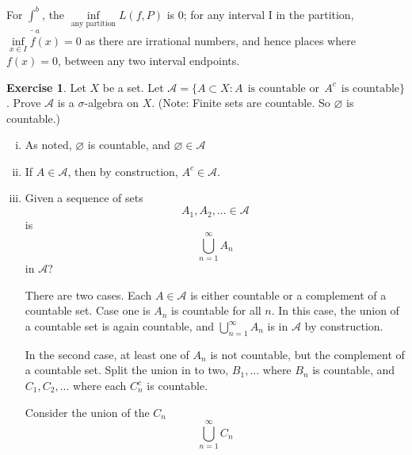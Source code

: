 \documentclass[11pt,oneside]{article}
\numberwithin{equation}{section}
\theoremstyle{definition}
\newtheorem{exercise}{Exercise}
\def\calA{\mathcal{A}}
\begin{document}
\begin{solution}
  For $\underline \int _a ^b$,
  the $\inf \limits_{\text{any partition}} L(f, P)$ is $0$;
  for any interval I in the
  partition, $\inf \limits _ {x \in I} f(x) = 0$ as there are
  irrational numbers, and hence places where $f(x) = 0$, between any
  two interval endpoints.
\end{solution}

\begin{exercise}
  Let $X$ be a set. Let $ \calA = \{A \subset X : A \ \ \text{is 
    countable or} \ \ A^c \ \ \text{is countable} \}$.  Prove $\calA$ is a
    $\sigma$-algebra on $X$. (Note: Finite sets are countable. So
    $\varnothing$ is countable.)
\end{exercise}
\begin{solution}
  \begin{enumerate}[(i)]
    \item
      As noted, $\varnothing $ is countable, and $\varnothing \in \calA$
    \item
      If $A \in \calA$, then by construction, $A^c \in \calA$.
    \item
      Given a sequence of sets
      $$
      A_1, A_2, ... \in \calA
      $$
      is
      $$ \bigcup _ {n =1} ^ \infty A_n
      $$ in $\calA$?

      There are two cases.  Each $A \in \calA$ is either countable or
      a complement of a countable set.  Case one is $A_n$ is countable
      for all $n$.  In this case, the union of a countable set is again countable, and
      $ \bigcup _ {n =1} ^ \infty A_n $ is in $\calA$ by construction.

      In the second case, at least one of $A_n$ is not countable, but
      the complement of a countable set.  Split the union in to two,
      $B_1, ... $ where $B_n$ is countable, and $C_1, C_2,...$ where
      each $C_n^c$ is countable.

      Consider the union of the $C_n$
      $$
      \bigcup _ {n=1}^\infty C_n
      $$


\end{enumerate}
\end{solution}
\end{document}

